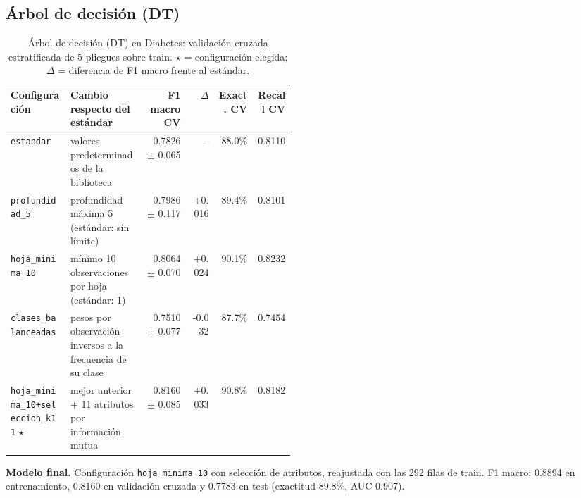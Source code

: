 \documentclass[11pt]{article}
\begin{document}
\FloatBarrier

\subsection{Árbol de decisión (DT)}

\begin{table}[H]\centering\footnotesize
\caption{Árbol de decisión (DT) en Diabetes: validación cruzada estratificada de 5 pliegues sobre train. $\star$ = configuración elegida; $\Delta$ = diferencia de F1 macro frente al estándar.}
\begin{tabular}{>{\raggedright\arraybackslash}p{0.21\linewidth}>{\raggedright\arraybackslash}p{0.26\linewidth}rrrr}\toprule
Configuración & Cambio respecto del estándar & F1 macro CV & $\Delta$ & Exact. CV & Recall CV \\ \midrule
\texttt{estandar} & valores predeterminados de la biblioteca & 0.7826 $\pm$ 0.065 & -- & 88.0\% & 0.8110 \\
\texttt{profundidad\_\allowbreak{}5} & profundidad máxima 5 (estándar: sin límite) & 0.7986 $\pm$ 0.117 & +0.016 & 89.4\% & 0.8101 \\
\texttt{hoja\_\allowbreak{}minima\_\allowbreak{}10} & mínimo 10 observaciones por hoja (estándar: 1) & 0.8064 $\pm$ 0.070 & +0.024 & 90.1\% & 0.8232 \\
\texttt{clases\_\allowbreak{}balanceadas} & pesos por observación inversos a la frecuencia de su clase & 0.7510 $\pm$ 0.077 & -0.032 & 87.7\% & 0.7454 \\
\texttt{hoja\_\allowbreak{}minima\_\allowbreak{}10+\allowbreak{}seleccion\_\allowbreak{}k11} $\star$ & mejor anterior + 11 atributos por información mutua & 0.8160 $\pm$ 0.085 & +0.033 & 90.8\% & 0.8182 \\
\bottomrule\end{tabular}
\end{table}

\textbf{Modelo final.} Configuración \texttt{hoja\_\allowbreak{}minima\_\allowbreak{}10} con selección de atributos, reajustada con las 292 filas de train. F1 macro: 0.8894 en entrenamiento, 0.8160 en validación cruzada y 0.7783 en test (exactitud 89.8\%, AUC 0.907).
\end{document}
